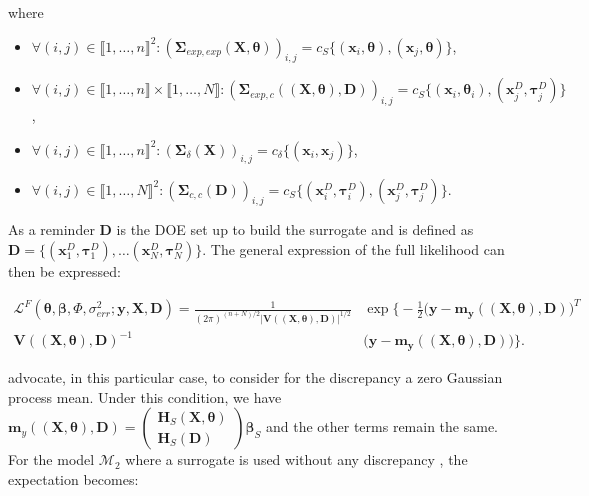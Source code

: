 \documentclass[soumission]{jsfds}
\edef\hc{\string: }
\begin{document}
\begin{sloppypar}
where \begin{itemize}
\item $\forall (i,j) \in \llbracket1,\dots,n\rrbracket^2: (\boldsymbol{\Sigma}_{exp,exp}(\boldsymbol{X},\boldsymbol{\theta}))_{i,j}=c_S\{(\boldsymbol{x}_i,\boldsymbol{\theta}),(\boldsymbol{x}_j,\boldsymbol{\theta})\}$,
\item $\forall (i,j) \in \llbracket1,\dots,n\rrbracket\times\llbracket1,\dots,N\rrbracket: (\boldsymbol{\Sigma}_{exp,c}((\boldsymbol{X},\boldsymbol{\theta}),\boldsymbol{D}))_{i,j}=c_S\{(\boldsymbol{x}_i,\boldsymbol{\theta}_i),(\boldsymbol{x}_j^D,\boldsymbol{\tau}_j^D)\}$,
\item $\forall (i,j)\in\llbracket1,\dots,n\rrbracket^2: (\boldsymbol{\Sigma}_{\delta}(\boldsymbol{X}))_{i,j}=c_{\delta}\{(\boldsymbol{x}_i,\boldsymbol{x}_j)\}$,
\item $\forall (i,j)\in \llbracket1,\dots,N\rrbracket^2: (\boldsymbol{\Sigma}_{c,c}(\boldsymbol{D}))_{i,j}=c_S\{(\boldsymbol{x}_i^D,\boldsymbol{\tau}_i^D),(\boldsymbol{x}_j^D,\boldsymbol{\tau}_j^D)\}$. \newline
\end{itemize}
\end{sloppypar}

As a reminder $\boldsymbol{D}$ is the DOE set up to build the surrogate and is defined as $\boldsymbol{D}=\{ (\boldsymbol{x}_1^D,\boldsymbol{\tau}_1^D),\dots (\boldsymbol{x}_N^D,\boldsymbol{\tau}_N^D) \}$. The general expression of the full likelihood can then be expressed\hc

\begin{equation}
\begin{split}
\mathcal{L}^F(\boldsymbol{\theta},\boldsymbol{\beta},\Phi,\sigma_{err}^2;\boldsymbol{y},\boldsymbol{X},\boldsymbol{D})=\frac{1}{(2\pi)^{(n+N)/2}|\boldsymbol{V}((\boldsymbol{X},\boldsymbol{\theta}),\boldsymbol{D})|^{1/2}}&\exp\Bigg\{-\frac{1}{2}\Big(\boldsymbol{y}-\boldsymbol{m}_{\boldsymbol{y}}((\boldsymbol{X},\boldsymbol{\theta}),\boldsymbol{D})\Big)^T\\\boldsymbol{V}((\boldsymbol{X},\boldsymbol{\theta}),\boldsymbol{D})^{-1}
&\Big(\boldsymbol{y}-\boldsymbol{m}_{\boldsymbol{y}}((\boldsymbol{X},\boldsymbol{\theta}),\boldsymbol{D})\Big)\Bigg\}.
\end{split}
\label{eq:FullLikelihood}
\end{equation}

\citet{bayarri2007,higdon2004} advocate, in this particular case, to consider for the discrepancy a zero Gaussian process mean. Under this condition, we have $\boldsymbol{m}_{y}((\boldsymbol{X},\boldsymbol{\theta}),\boldsymbol{D})=\begin{pmatrix}
\boldsymbol{H}_S(\boldsymbol{X},\boldsymbol{\theta})\\
\boldsymbol{H}_S(\boldsymbol{D})
\end{pmatrix}\boldsymbol{\beta}_S $ and the other terms remain the same. For the model $\mathcal{M}_2$ where a surrogate is used without any discrepancy \citep{cox2001}, the expectation becomes\hc
\end{document}
